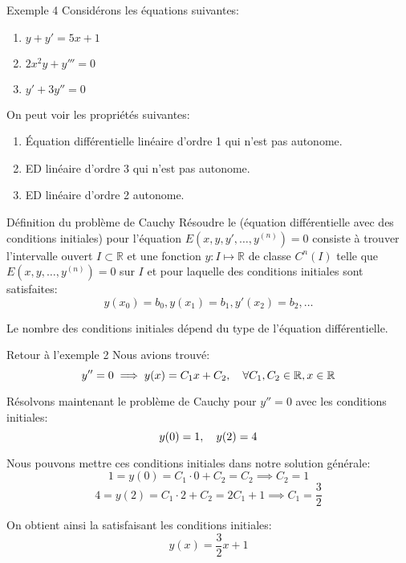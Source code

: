 \documentclass[a4paper]{article}
\begin{document}
\begin{parag}{Exemple 4}
    Considérons les équations suivantes:
    \begin{enumerate}
        \item $\displaystyle y + y' = 5x + 1$ 
        \item $\displaystyle 2x^2 y + y''' = 0$
        \item $\displaystyle y' + 3y'' = 0$
    \end{enumerate}
    
    On peut voir les propriétés suivantes:
    \begin{enumerate}
        \item Équation différentielle linéaire d'ordre 1 qui n'est pas autonome.
        \item ED linéaire d'ordre 3 qui n'est pas autonome.
        \item ED linéaire d'ordre 2 autonome.
    \end{enumerate}
\end{parag}

\begin{parag}{Définition du problème de Cauchy}
    Résoudre le  (équation différentielle avec des conditions initiales) pour l'équation $E\left(x, y, y', \ldots, y^{\left(n\right)}\right) = 0$ consiste à trouver l'intervalle ouvert $I \subset \mathbb{R}$ et une fonction $y : I \mapsto \mathbb{R}$ de classe $C^n\left(I\right)$ telle que $E\left(x, y, \ldots, y^{\left(n\right)}\right) = 0$ sur $I$ et pour laquelle des conditions initiales sont satisfaites:
    \[y\left(x_0\right) = b_0, y\left(x_1\right) = b_1, y'\left(x_2\right) = b_2, \ldots\]
    
    Le nombre des conditions initiales dépend du type de l'équation différentielle.
\end{parag}

\begin{parag}{Retour à l'exemple 2}
    Nous avions trouvé: 
    \[y'' = 0 \implies y\left(x\right) = C_1 x + C_2, \mathspace \forall C_1, C_2 \in \mathbb{R}, x \in \mathbb{R}\]
    
    Résolvons maintenant le problème de Cauchy pour $y'' = 0$ avec les conditions initiales: 
    \[y\left(0\right) = 1, \mathspace y\left(2\right) = 4\]
    
    Nous pouvons mettre ces conditions initiales dans notre solution générale: 
    \[1 = y\left(0\right) = C_1\cdot 0 + C_2 = C_2 \implies C_2 = 1\]
    \[4 = y\left(2\right) = C_1 \cdot 2 + C_2 = 2C_1 + 1 \implies C_1 = \frac{3}{2}\]
    
    On obtient ainsi la  satisfaisant les conditions initiales: 
    \[y\left(x\right) = \frac{3}{2}x + 1\]
\end{parag}
\end{document}
